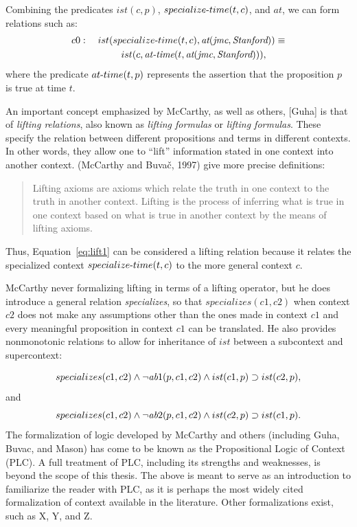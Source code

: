 Combining the predicates $ist(c, p)$, $specialize\textnormal{-}time(t, c)$, and $at$, we can form relations such as:
\begin{equation}
\label{eq:lift1}
\begin{aligned}
c0: \quad ist(specialize\textnormal{-}time(t,c),\hbox{\it at}
(\hbox{\it jmc},\hbox{\it Stanford}))
\equiv \\
ist(c,\hbox{\it at-time}(t,\hbox{\it at}(\hbox{\it jmc},
\hbox{\it Stanford}))),
\qquad
\end{aligned}
\end{equation}
where the predicate $at\textnormal{-}time(t,p)$ represents the assertion that the proposition $p$ is true at time $t$. 

An important concept emphasized by McCarthy, as well as others, [Guha] is that of \emph{lifting relations}, also known as \emph{lifting formulas} or \emph{lifting formulas}. These specify the relation between different propositions and terms in different contexts. In other words, they allow one to ``lift'' information stated in one context into another context. (McCarthy and Buva\v{c}, 1997) give more precise definitions:
\begin{quote}
Lifting axioms are axioms which relate the truth in one context
to the truth in another context.
Lifting is the process of inferring what is true in one context based
on what is true in another context by the means of lifting axioms.
\end{quote}
Thus, Equation~\ref{eq:lift1} can be considered a lifting relation because it relates the specialized context $specialize\textnormal{-}time(t, c)$ to the more general context $c$. 

McCarthy never formalizing lifting in terms of a lifting operator, but he does introduce a general relation \emph{specializes}, so that $specializes(c1,c2)$ when context $c2$ does not make any assumptions other than the ones made in context $c1$ and every meaningful proposition in context $c1$ can be translated. He also provides nonmonotonic relations to allow for inheritance of $ist$ between a subcontext and supercontext:

\begin{equation}
specializes(c1,c2) \land \lnot \hbox{\it ab}1(p,c1,c2) \land ist(c1,p)
\supset ist(c2,p),\label{spec1}
\end{equation}
%
and
%
\begin{equation}
specializes(c1,c2) \land \lnot \hbox{\it ab}2(p,c1,c2) \land ist(c2,p)
\supset ist(c1,p). 
\end{equation}
%
The formalization of logic developed by McCarthy and others (including Guha, Buvac, and Mason) has come to be known as the Propositional Logic of Context (PLC). A full treatment of PLC, including its strengths and weaknesses, is beyond the scope of this thesis. The above is meant to serve as an introduction to familiarize the reader with PLC, as it is perhaps the most widely cited formalization of context available in the literature. Other formalizations exist, such as X, Y, and Z.

